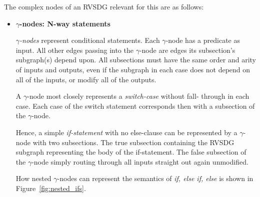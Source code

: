 The complex nodes of an RVSDG relevant for this are as follows:

\begin{itemize}

\item \textbf{$\gamma$-nodes: N-way statements}

\textit{$\gamma$-nodes} represent conditional statements. Each $\gamma$-node has
a predicate as input. All other edges passing into the $\gamma$-node are edges
its subsection's subgraph(s) depend upon. All subsections must have the same
order and arity of inputs and outputs, even if the subgraph in each case does
not depend on all of the inputs, or modify all of the outputs.

A $\gamma$-node most closely represents a \textit{switch-case} without fall-
through in each case. Each case of the switch statement corresponds then with a
subsection of the $\gamma$-node.

Hence, a simple \textit{if-statement} with no else-clause can be represented by
a $\gamma$-node with two subsections. The true subsection containing the RVSDG
subgraph representing the body of the if-statement. The false subsection of the
$\gamma$-node simply routing through all inputs straight out again unmodified.

How nested $\gamma$-nodes can represent the semantics of \textit{if, else if,
else} is shown in Figure~\ref{fig:nested_ifs}.


\end{itemize}
